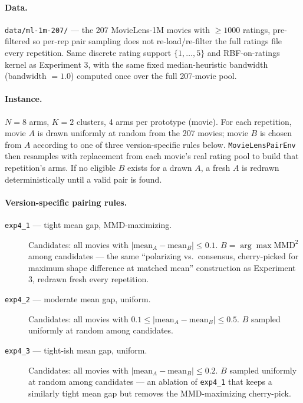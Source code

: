 \documentclass[11pt]{article}
\begin{document}
\paragraph{Data.} \texttt{data/ml-1m-207/} --- the 207 MovieLens-1M movies
with $\ge 1000$ ratings, pre-filtered so per-rep pair sampling does not
re-load/re-filter the full ratings file every repetition. Same discrete
rating support $\{1,\ldots,5\}$ and RBF-on-ratings kernel as Experiment 3,
with the same fixed median-heuristic bandwidth (bandwidth $=1.0$) computed
once over the full 207-movie pool.

\paragraph{Instance.} $N=8$ arms, $K=2$ clusters, 4 arms per prototype (movie).
For each repetition, movie $A$ is drawn uniformly at random from the 207
movies; movie $B$ is chosen from $A$ according to one of three
version-specific rules below. \texttt{MovieLensPairEnv} then resamples with
replacement from each movie's real rating pool to build that repetition's
arms. If no eligible $B$ exists for a drawn $A$, a fresh $A$ is redrawn
deterministically until a valid pair is found.

\paragraph{Version-specific pairing rules.}
\begin{description}
  \item[\texttt{exp4\_1} --- tight mean gap, MMD-maximizing.] Candidates: all
    movies with $|\text{mean}_A - \text{mean}_B| \le 0.1$. $B = \arg\max
    \mathrm{MMD}^2$ among candidates --- the same ``polarizing vs.\ consensus,
    cherry-picked for maximum shape difference at matched mean'' construction
    as Experiment 3, redrawn fresh every repetition.
  \item[\texttt{exp4\_2} --- moderate mean gap, uniform.] Candidates: all
    movies with $0.1 \le |\text{mean}_A - \text{mean}_B| \le 0.5$. $B$ sampled
    uniformly at random among candidates.
  \item[\texttt{exp4\_3} --- tight-ish mean gap, uniform.] Candidates: all
    movies with $|\text{mean}_A - \text{mean}_B| \le 0.2$. $B$ sampled
    uniformly at random among candidates --- an ablation of \texttt{exp4\_1}
    that keeps a similarly tight mean gap but removes the MMD-maximizing
    cherry-pick.
\end{description}
\end{document}
